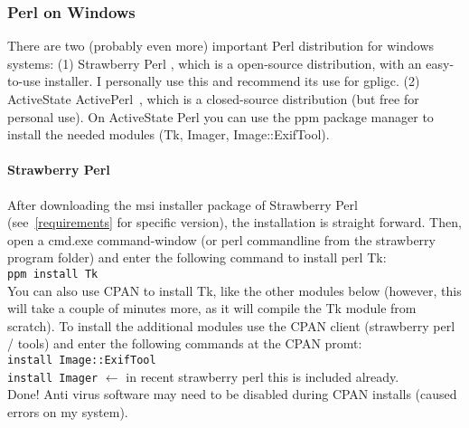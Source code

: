 

\subsubsection{Perl on Windows}
\label{perl}
There are two (probably even more) important Perl distribution for windows systems:
(1) Strawberry Perl \cite{strawberryperl}, which is a open-source distribution, with an easy-to-use installer. 
I personally use this and recommend its use for gpligc. 
(2) ActiveState ActivePerl~\cite{activeperl}, which is a closed-source distribution (but free for personal use).
On ActiveState Perl you can use the ppm package manager to install the needed modules (Tk, Imager, Image::ExifTool).

\paragraph{Strawberry Perl}
After downloading the msi installer package of Strawberry Perl (see~\ref{requirements} for specific version),
the installation is straight forward.
Then, open a cmd.exe command-window (or perl commandline from the strawberry program folder) and enter the following
command to install perl Tk:\\
\texttt{ppm install Tk}\\
You can also use CPAN to install Tk, like the other modules below (however, this will take a couple of minutes more, as it will compile the Tk module from scratch).
To install the additional modules use the CPAN client (strawberry perl / tools) and enter the following commands
at the CPAN promt:\\
\texttt{install Image::ExifTool}\\
\texttt{install Imager}  $\leftarrow$ in recent strawberry perl this is included already.\\
Done!
Anti virus software may need to be disabled during CPAN installs (caused errors on my system).



